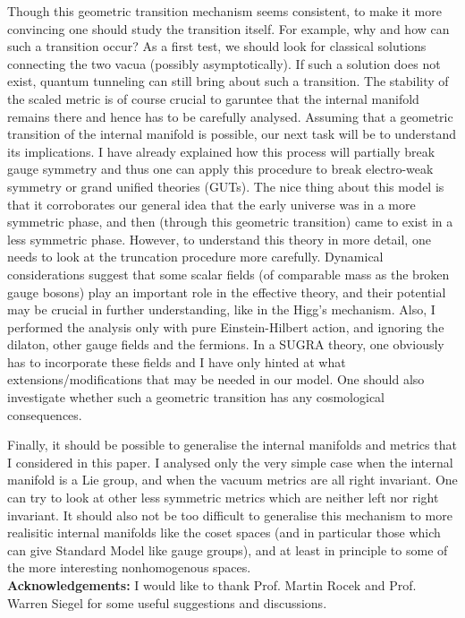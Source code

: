 \documentclass[a4paper,12pt]{article}
\begin{document}
Though this geometric transition mechanism seems consistent, to make it more convincing one should study the transition itself. For example, why and how can such a transition occur? As a first test, we should  look for classical solutions connecting the two vacua (possibly asymptotically). If such a solution does not exist, quantum tunneling can still bring about such a transition. The stability of the scaled metric is of course crucial to garuntee that the internal manifold remains there and hence has to be carefully analysed. Assuming that a geometric transition of the internal manifold is possible, our next task will be to understand its implications. I have already explained how this process will partially break gauge symmetry and thus  one can apply this procedure to break electro-weak symmetry or  grand unified theories (GUTs). The nice thing about this model is that it corroborates our general idea that the early universe was in a more symmetric phase, and then (through this geometric transition) came to exist in a less symmetric phase. However, to understand this theory in more detail, one needs to look at the truncation procedure more carefully. Dynamical considerations suggest that some scalar fields (of comparable mass as the broken gauge bosons) play an important role in the effective theory, and their potential may be crucial in further understanding, like in the Higg's mechanism. Also, I performed the analysis only with pure Einstein-Hilbert action, and ignoring the dilaton, other gauge fields and the fermions. In a SUGRA theory, one obviously has to incorporate these fields and I have only hinted at what extensions/modifications that may be needed in our model. One should also investigate whether such a geometric transition has any  cosmological consequences.

Finally, it should be possible to generalise the internal manifolds and metrics that I considered in this paper. I analysed only the very simple case when the internal manifold is a Lie group, and when the vacuum metrics are all right invariant. One can try to look at other less symmetric metrics which are neither left nor right invariant. It should also not be too difficult to generalise this mechanism to more realisitic internal manifolds like the coset spaces (and in particular those which can give Standard Model like gauge groups), and at least in principle to some of the more interesting nonhomogenous spaces. 
\vspace{5mm}\\
{\large {\bf Acknowledgements:}} I would like to thank Prof. Martin Rocek and Prof. Warren Siegel for some useful suggestions and discussions.
\end{document}
